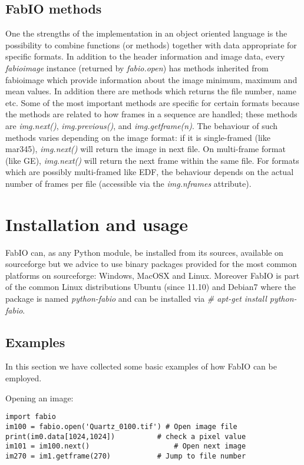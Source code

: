 \documentclass[preprint]{iucr}
\begin{document}
\subsection{FabIO methods}

One the strengths of the implementation in an object oriented language
is the possibility to combine functions (or methods) together with data
appropriate for specific formats.
In addition to the header information and image data, every {\em fabioimage}
instance (returned by {\em fabio.open}) has methods inherited from fabioimage 
which provide information about the image minimum, maximum and mean values.
In addition there are methods which returns the file number, name etc. 
Some of the most important methods are specific for certain formats because 
the methods are related to how frames in a sequence are handled; these methods
are {\em img.next()}, {\em img.previous()}, and {\em img.getframe(n)}.
The behaviour of such methods varies depending on the
image format: if it is single-framed (like mar345),  {\em img.next()} will
return the image in next file. On multi-frame format (like GE), {\em img.next()}
will return the next frame within the same file. For formats which are possibly 
multi-framed like EDF, the behaviour depends on the actual number of  frames per
file (accessible via the {\em img.nframes} attribute).


\section{Installation and usage}

FabIO can, as any Python module, be installed from its sources, available on 
sourceforge \cite{fabio} but we advice to use binary packages provided for the
most common platforms on sourceforge: Windows, MacOSX and Linux.
Moreover FabIO is part of the common Linux distributions Ubuntu (since 11.10)
and Debian7 where the package is named {\em python-fabio} and can be installed
via {\em \# apt-get install python-fabio}. 

\subsection{Examples}

In this section we have collected some basic examples of how FabIO can be employed. 

Opening an image:\\
\begin{verbatim}
import fabio     
im100 = fabio.open('Quartz_0100.tif') # Open image file
print(im0.data[1024,1024])          # check a pixel value
im101 = im100.next()                    # Open next image
im270 = im1.getframe(270)           # Jump to file number
\end{verbatim}
\end{document}
